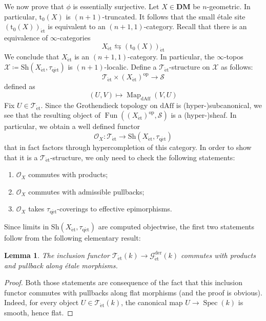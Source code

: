 \documentclass[12pt,a4paper,reqno]{amsart}
\theoremstyle{plain}
\newtheorem{lem}[thm]{Lemma}
\theoremstyle{definition}
\theoremstyle{remark}
\numberwithin{equation}{section}
\begin{document}
We now prove that $\phi$ is essentially surjective.
Let $X \in \mathbf{DM}$ be $n$-geometric.
In particular, ${\mathrm{t}_0}(X)$ is $(n+1)$-truncated.
It follows that the small \'etale site $({\mathrm{t}_0}(X))_{\mathrm{\acute{e}t}}$ is equivalent to an $(n+1,1)$-category.
Recall that there is an equivalence of $\infty$-categories
\[ X_{\mathrm{\acute{e}t}} \leftrightarrows ({\mathrm{t}_0}(X))_{\mathrm{\acute{e}t}} \]
We conclude that $X_{\mathrm{\acute{e}t}}$ is an $(n+1,1)$-category.
In particular, the $\infty$-topos ${\mathcal X} \coloneqq {\mathrm{Sh}}(X_{\mathrm{\acute{e}t}}, {\tau_\mathrm{q\acute{e}t}})$ is $(n+1)$-localic.
Define a ${{\mathcal T}_{\mathrm{\acute{e}t}}}$-structure on ${\mathcal X}$ as follows:
\[ {{\mathcal T}_{\mathrm{\acute{e}t}}} \times (X_{\mathrm{\acute{e}t}})^{\mathrm{op}} \to {\mathcal S} \]
defined as
\[ (U, V) \mapsto \operatorname{Map}_{\mathrm{dAff}}(V, U) \]
{\ignorespaces}
Fix $U \in {{\mathcal T}_{\mathrm{\acute{e}t}}}$. Since the Grothendieck topology on $\mathrm{dAff}$ is (hyper-)subcanonical, we see that the resulting object of $\operatorname{Fun}((X_{\mathrm{\acute{e}t}})^{\mathrm{op}}, {\mathcal S})$ is a (hyper-)sheaf.
In particular, we obtain a well defined functor
\[ {\mathcal O}_X \colon {{\mathcal T}_{\mathrm{\acute{e}t}}} \to {\mathrm{Sh}}(X_{\mathrm{\acute{e}t}}, {\tau_\mathrm{q\acute{e}t}}) \]
that in fact factors through hypercompletion of this category.
In order to show that it is a ${{\mathcal T}_{\mathrm{\acute{e}t}}}$-structure, we only need to check the following statements:
\begin{enumerate}
	\item ${\mathcal O}_X$ commutes with products;
	\item ${\mathcal O}_X$ commutes with admissible pullbacks;
	\item ${\mathcal O}_X$ takes ${\tau_\mathrm{q\acute{e}t}}$-coverings to effective epimorphisms.
\end{enumerate}
Since limits in ${\mathrm{Sh}}(X_{\mathrm{\acute{e}t}}, {\tau_\mathrm{q\acute{e}t}})$ are computed objectwise, the first two statements follow from the following elementary result:

\begin{lem}
	The inclusion functor ${{\mathcal T}_{\mathrm{\acute{e}t}}(k)} \to {{\mathcal G}_{\mathrm{\acute{e}t}}^\mathrm{der}(k)}$ commutes with products and pullback along \'etale morphisms.
\end{lem}

\begin{proof}
	Both those statements are consequence of the fact that this inclusion functor commutes with pullbacks along flat morphisms (and the proof is obvious).
	Indeed, for every object $U \in {{\mathcal T}_{\mathrm{\acute{e}t}}(k)}$, the canonical map $U \to \operatorname{Spec}(k)$ is smooth, hence flat.
\end{proof}
\end{document}
